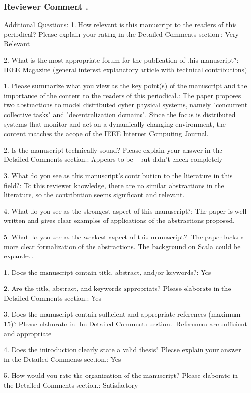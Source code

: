 \documentclass{article}
\newcounter{reviewer}
\newcounter{comment}[reviewer]
\newcommand{\comment}[1]{
	\subsubsection*{\refstepcounter{comment}Reviewer Comment \arabic{reviewer}.\arabic{comment}} %
	\colorbox{gray!10}{\parbox[t]{\linewidth}{\setlength{\parskip}{0.5\baselineskip}%
 #1 }}
}
\begin{document}
\comment{

	Additional Questions:
	1. How relevant is this manuscript to the readers of this periodical? Please explain your rating in the Detailed Comments section.: Very Relevant
	
	2. What is the most appropriate forum for the publication of this manuscript?: IEEE Magazine (general interest explanatory article with technical contributions)
	
	1. Please summarize what you view as the key point(s) of the manuscript and the importance of the content to the readers of this periodical.: The paper proposes two abstractions to model distributed cyber physical systems, namely "concurrent collective tasks" and "decentralization domains". Since the focus is distributed systems that monitor and act on a dynamically changing environment, the content matches the acope of the IEEE Internet Computing Journal.
	
	2. Is the manuscript technically sound? Please explain your answer in the Detailed Comments section.: Appears to be - but didn't check completely
	
	3. What do you see as this manuscript's contribution to the literature in this field?: To this reviewer knowledge, there are no similar abstractions in the literature, so the contribution seems significant and relevant.
	
	4. What do you see as the strongest aspect of this manuscript?: The paper is well written and gives clear examples of applications of the abstractions proposed.
	
	5. What do you see as the weakest aspect of this manuscript?: The paper lacks a more clear formalization of the abstractions. The background on Scala could be expanded.
	
	1. Does the manuscript contain title, abstract, and/or keywords?: Yes
	
	2. Are the title, abstract, and keywords appropriate? Please elaborate in the Detailed Comments section.: Yes
	
	3. Does the manuscript contain sufficient and appropriate references (maximum 15)? Please elaborate in the Detailed Comments section.: References are sufficient and appropriate
	
	4. Does the introduction clearly state a valid thesis? Please explain your answer in the Detailed Comments section.: Yes
	
	5. How would you rate the organization of the manuscript? Please elaborate in the Detailed Comments section.: Satisfactory
	
}
\end{document}
